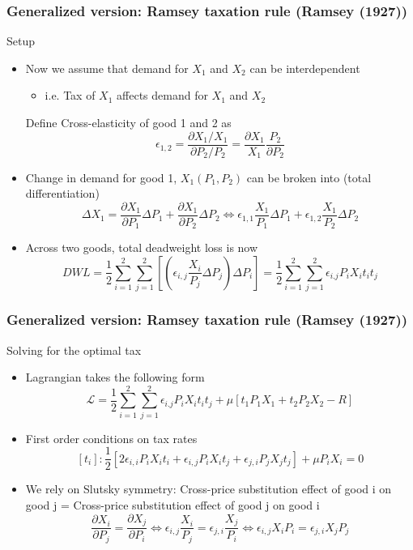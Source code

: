 \documentclass[aspectratio=169]{beamer}
\begin{document}
\begin{frame}
\frametitle{Generalized version: Ramsey taxation rule (Ramsey (1927))}
Setup
\begin{itemize}\setlength\itemsep{3pt}
\item Now we assume that demand for $X_1$ and $X_2$ can be interdependent
\begin{itemize}\setlength\itemsep{3pt}
\item i.e. Tax of $X_1$ affects demand for $X_1$ and $X_2$
\end{itemize}
Define Cross-elasticity of good 1 and 2 as
\[
\epsilon_{1,2}= \frac{\partial X_1/X_1}{\partial P_2/P_2}=\frac{\partial X_1}{X_1}\frac{P_2}{\partial P_2}
\]
\item Change in demand for good 1, $X_1(P_1,P_2)$  can be broken into (total differentiation)
 \[
 \Delta X_1 = \frac{\partial X_1}{\partial P_1}\Delta P_1+\frac{\partial X_1}{\partial P_2}\Delta P_2 \iff \epsilon_{1,1} \frac{X_1}{P_1}\Delta P_1+\epsilon_{1,2} \frac{X_1}{P_2}\Delta P_2 
\]
\item Across two goods, total deadweight loss is now
\[
DWL = \frac{1}{2}\sum_{i=1}^2\sum_{j=1}^2 \left[\left(\epsilon_{i,j}\frac{X_i}{P_j}\Delta P_j\right) \Delta P_i\right]=\frac{1}{2}\sum_{i=1}^2\sum_{j=1}^2 \epsilon_{i.j}P_iX_it_it_j
\]
\end{itemize}
\end{frame}


\begin{frame}
\frametitle{Generalized version: Ramsey taxation rule (Ramsey (1927))}
Solving for the optimal tax
\begin{itemize}\setlength\itemsep{3pt}
\item Lagrangian takes the following form
\[
\mathcal{L}=\frac{1}{2}\sum_{i=1}^2\sum_{j=1}^2 \epsilon_{i.j}P_iX_it_it_j + \mu[t_1P_1X_1+t_2P_2X_2 - R]
\]
\item First order conditions on tax rates
\[
[t_i]: \frac{1}{2}[2\epsilon_{i,i}P_iX_it_i+\epsilon_{i,j}P_iX_it_j+\epsilon_{j,i}P_jX_jt_j]+\mu P_iX_i=0
\]
\item We rely on Slutsky symmetry: Cross-price substitution effect of good i on good j = Cross-price substitution effect of good j on good i
\[
\frac{\partial X_i}{\partial P_j}=\frac{\partial X_j}{\partial P_i} \iff \epsilon_{i,j}\frac{X_i}{P_j}=\epsilon_{j,i}\frac{X_j}{P_i} \iff\epsilon_{i,j}X_i P_i=\epsilon_{j,i} X_j P_j
\]
\end{itemize}
\end{frame}
\end{document}
